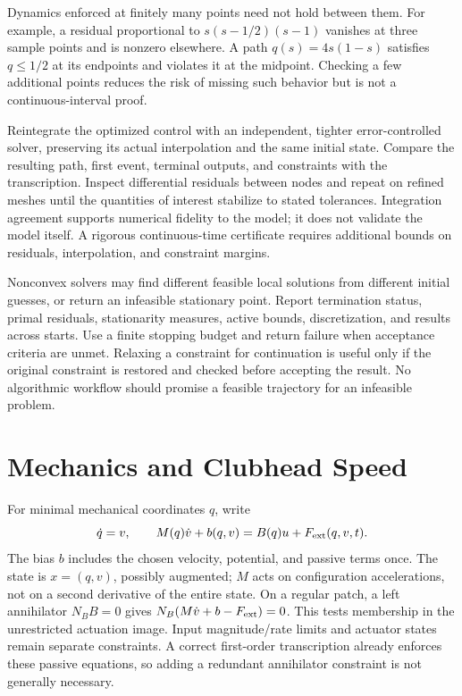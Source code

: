 \documentclass[12pt, openany]{book}
\theoremstyle{plain}
\begin{document}
Dynamics enforced at finitely many points need not hold between them. For
example, a residual proportional to $s(s-1/2)(s-1)$ vanishes at three sample
points and is nonzero elsewhere. A path $q(s)=4s(1-s)$ satisfies
$q\leq1/2$ at its endpoints and violates it at the midpoint. Checking a few
additional points reduces the risk of missing such behavior but is not a
continuous-interval proof.

Reintegrate the optimized control with an independent, tighter error-controlled
solver, preserving its actual interpolation and the same initial state.
Compare the resulting path, first event, terminal outputs, and constraints
with the transcription. Inspect differential residuals between nodes and
repeat on refined meshes until the quantities of interest stabilize to stated
tolerances. Integration agreement supports numerical fidelity to the model;
it does not validate the model itself. A rigorous continuous-time certificate
requires additional bounds on residuals, interpolation, and constraint margins.

Nonconvex solvers may find different feasible local solutions from different
initial guesses, or return an infeasible stationary point. Report termination
status, primal residuals, stationarity measures, active bounds, discretization,
and results across starts. Use a finite stopping budget and return failure
when acceptance criteria are unmet. Relaxing a constraint for continuation
is useful only if the original constraint is restored and checked before
accepting the result. No algorithmic workflow should promise a feasible
trajectory for an infeasible problem.

\section{Mechanics and Clubhead Speed}

For minimal mechanical coordinates $q$, write
\begin{equation}\label{eq:ocp_underactuation}
 \dot q=v,\qquad M(q)\dot v+b(q,v)=B(q)u+F_{\rm ext}(q,v,t).
\end{equation}
The bias $b$ includes the chosen velocity, potential, and passive terms once.
The state is $x=(q,v)$, possibly augmented; $M$ acts on configuration
accelerations, not on a second derivative of the entire state. On a regular
patch, a left annihilator $N_BB=0$ gives
$N_B(M\dot v+b-F_{\rm ext})=0$. This tests membership in the unrestricted
actuation image. Input magnitude/rate limits and actuator states remain
separate constraints. A correct first-order transcription already enforces
these passive equations, so adding a redundant annihilator constraint is
not generally necessary.
\end{document}

